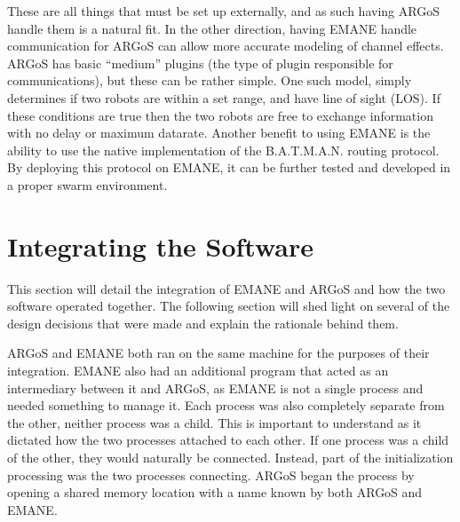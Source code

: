 These are all things that must be set up externally, and as such having ARGoS handle them is a natural fit.
In the other direction, having EMANE handle communication for ARGoS can allow more accurate modeling of channel effects.
ARGoS has basic ``medium'' plugins (the type of plugin responsible for communications), but these can be rather simple.
One such model, simply determines if two robots are within a set range, and have line of sight (LOS).
If these conditions are true then the two robots are free to exchange information with no delay or maximum datarate.
Another benefit to using EMANE is the ability to use the native implementation of the B.A.T.M.A.N. routing protocol.
By deploying this protocol on EMANE, it can be further tested and developed in a proper swarm environment.

\section{Integrating the Software}
This section will detail the integration of EMANE and ARGoS and how the two software operated together.
The following section will shed light on several of the design decisions that were made and explain the rationale behind them.\par
ARGoS and EMANE both ran on the same machine for the purposes of their integration.
EMANE also had an additional program that acted as an intermediary between it and ARGoS, as EMANE is not a single process and needed something to manage it.
Each process was also completely separate from the other, neither process was a child.
This is important to understand as it dictated how the two processes attached to each other.
If one process was a child of the other, they would naturally be connected. Instead, part of the initialization processing was the two processes connecting.
ARGoS began the process by opening a shared memory location with a name known by both ARGoS and EMANE.
